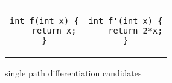 

\begin{figure}
\begin{tabular}{cc}
\centering
\begin{lstlisting}
int f(int x) {
    return x;
}
\end{lstlisting}
&
\begin{lstlisting}
int f'(int x) {
    return 2*x;
}
\end{lstlisting}
\end{tabular}
\caption{single path differentiation candidates}
\end{figure}

